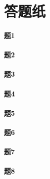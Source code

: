 \documentclass{ctexart}
\begin{document}
\pagestyle{empty}

\section*{\Huge{答题纸}}

\paragraph{题1}
\newpage

\paragraph{题2}
\newpage

\paragraph{题3}
\newpage

\paragraph{题4}
\newpage

\paragraph{题5}
\newpage

\paragraph{题6}
\newpage

\paragraph{题7}
\newpage

\paragraph{题8}
\newpage
\end{document}
